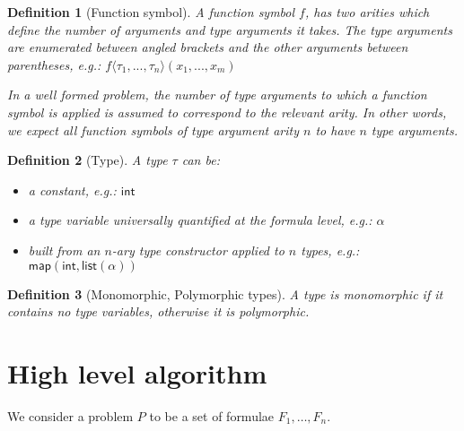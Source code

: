 \documentclass[]{ceurart}
\newcommand\ty[1]{\textsf{#1}}
\newtheorem{definition}{Definition}
\begin{document}
\begin{definition}[Function symbol]
   A function symbol \(f\), has two arities which define the number of arguments and type arguments it takes. The type arguments are enumerated between angled brackets and the other arguments between parentheses, e.g.: \(f\langle \tau_1, ..., \tau_n\rangle (x_1, ..., x_m)\)

   In a well formed problem, the number of type arguments to which a function symbol is applied is assumed to correspond to the relevant arity. In other words, we expect all function symbols of type argument arity \(n\) to have \(n\) type arguments.
\end{definition}

\begin{definition}[Type]
A type \(\tau\) can be:
\begin{itemize}
   \item a constant, e.g.: \(\ty{int}\)
   \item a type variable universally quantified at the formula level, e.g.: \(\alpha\)
   \item built from an \(n\)-ary type constructor applied to \(n\) types, e.g.: \(\ty{map}(\ty{int}, \ty{list}(\alpha))\)
\end{itemize}

\end{definition}

\begin{definition}[Monomorphic, Polymorphic types]
A type is monomorphic if it contains no type variables, otherwise it is polymorphic.
\end{definition}


\section{High level algorithm}
\label{sec:high-level-algorithm}

We consider a problem \(P\) to be a set of formulae \(F_1, \dots, F_n\).
\end{document}
